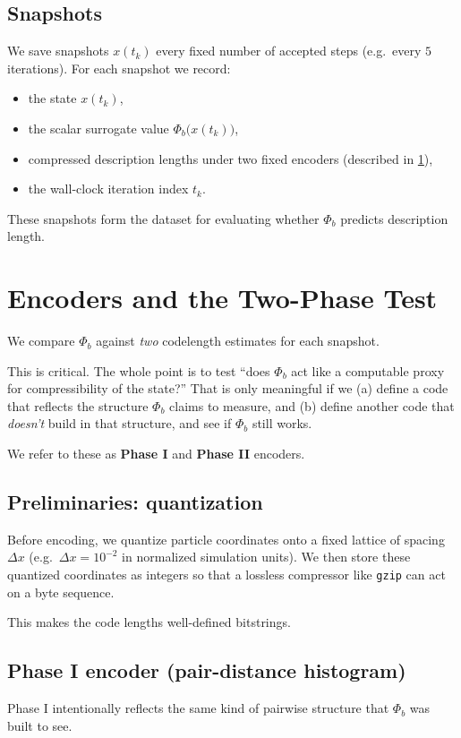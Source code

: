 \documentclass[11pt,a4paper]{article}
\numberwithin{equation}{section}
\newcommand{\phib}{\Phi_b}
\begin{document}
\subsection{Snapshots}
We save snapshots $x(t_k)$ every fixed number of accepted steps (e.g.\ every $5$ iterations). For each snapshot we record:
\begin{itemize}
\item the state $x(t_k)$,
\item the scalar surrogate value $\phib\big(x(t_k)\big)$,
\item compressed description lengths under two fixed encoders (described in \cref{sec:encoders}),
\item the wall-clock iteration index $t_k$.
\end{itemize}

These snapshots form the dataset for evaluating whether $\phib$ predicts description length.

\section{Encoders and the Two-Phase Test}
\label{sec:encoders}

We compare $\phib$ against \emph{two} codelength estimates for each snapshot.

This is critical. The whole point is to test ``does $\phib$ act like a computable proxy for compressibility of the state?'' That is only meaningful if we (a) define a code that reflects the structure $\phib$ claims to measure, and (b) define another code that \emph{doesn't} build in that structure, and see if $\phib$ still works.

We refer to these as \textbf{Phase I} and \textbf{Phase II} encoders.

\subsection{Preliminaries: quantization}
Before encoding, we quantize particle coordinates onto a fixed lattice of spacing $\Delta x$ (e.g.\ $\Delta x = 10^{-2}$ in normalized simulation units). We then store these quantized coordinates as integers so that a lossless compressor like \texttt{gzip} can act on a byte sequence.

This makes the code lengths well-defined bitstrings.

\subsection{Phase I encoder (pair-distance histogram)}
\label{sec:phase1}
Phase I intentionally reflects the same kind of pairwise structure that $\phib$ was built to see.
\end{document}

